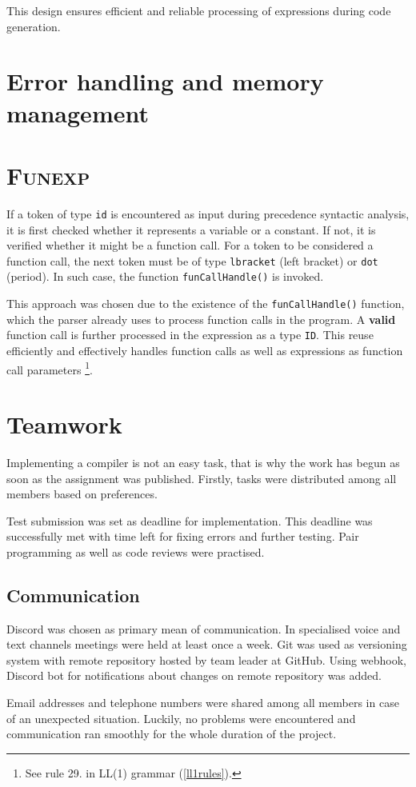 \documentclass[a4paper, 11pt]{article}
\begin{document}
This design ensures efficient and reliable processing of expressions during code generation.


\section{Error handling and memory management}\label{sec:ERR}

\section{\textsc{Funexp}}
If a token of type \verb|id| is encountered as input during precedence syntactic analysis, it is first checked whether it represents a variable 
or a constant. If not, it is verified whether it might be a function call. For a token to be considered a 
function call, the next token must be of type \verb|lbracket| (left bracket) or \verb|dot| (period). In such
case, the function \verb|funCallHandle()| is invoked.
\par
This approach was chosen due to the existence of the \verb|funCallHandle()| function, which the parser already 
uses to process function calls in the program. A \textbf{valid} function call is further processed in the expression 
as a type \verb|ID|. This reuse efficiently and effectively handles function calls as well as expressions as function call parameters
\footnote{See rule 29. in LL(1) grammar (\ref{ll1rules}).}.


\section{Teamwork}\label{sec:TEAM}
Implementing a compiler is not an easy task, that is why the work has begun as soon as 
the assignment was published. Firstly, tasks were distributed among all members based on 
preferences.\par 
Test submission was set as deadline for implementation. This deadline
was successfully met with time left for fixing errors and further testing. Pair programming as well as 
code reviews were practised. 

\subsection{Communication}\label{sec:COMM}
Discord was chosen as primary mean of communication. In specialised voice and text channels meetings were
held at least once a week. Git was used as versioning system with remote repository hosted by team leader at
GitHub. Using webhook, Discord bot for notifications about changes on remote repository was added.\par
Email addresses and telephone numbers were shared among all members in case of an unexpected situation.
Luckily, no problems were encountered and communication ran smoothly for the whole duration of the project.
\end{document}
